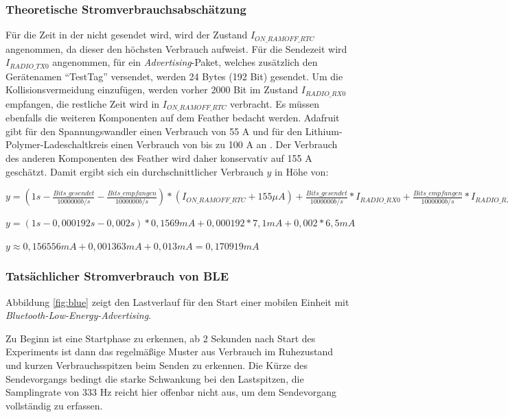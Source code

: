 \subsubsection{Theoretische Stromverbrauchsabschätzung}
Für die Zeit in der nicht gesendet wird, wird der Zustand $I_{ON\_RAMOFF\_RTC}$ angenommen, da dieser den höchsten Verbrauch aufweist.
Für die Sendezeit wird $I_{RADIO\_TX0}$ angenommen, für ein \emph{Advertising}-Paket, welches zusätzlich den Gerätenamen "`TestTag"' versendet, werden 24 Bytes (192 Bit) gesendet.
Um die Kollisionsvermeidung einzufügen, werden vorher 2000 Bit im Zustand $I_{RADIO\_RX0}$ empfangen, die restliche Zeit wird in $I_{ON\_RAMOFF\_RTC}$ verbracht.
Es müssen ebenfalls die weiteren Komponenten auf dem Feather bedacht werden.
Adafruit gibt für den Spannungswandler einen Verbrauch von 55 \textmu A und für den Lithium-Polymer-Ladeschaltkreis einen Verbrauch von bis zu 100 \textmu A an \cite{fried2016lora}.
Der Verbrauch des anderen Komponenten des Feather wird daher konservativ auf 155 \textmu A geschätzt.
Damit ergibt sich ein durchschnittlicher Verbrauch $y$ in Höhe von:

$y = (1s-\frac{Bits\_gesendet}{1000000 b/s} - \frac{Bits\_empfangen}{1000000 b/s}) * (I_{ON\_RAMOFF\_RTC} + 155 {\mu}A) + \frac{Bits\_gesendet}{1000000 b/s} * I_{RADIO\_RX0} + \frac{Bits\_empfangen}{1000000 b/s} * I_{RADIO\_RX0}$

$y = (1s - 0,000192s - 0,002s) * 0,1569mA + 0,000192 * 7,1mA + 0,002 * 6,5mA$

$y \approx 0,156556mA + 0,001363mA + 0,013mA = 0,170919mA$

\subsubsection{Tatsächlicher Stromverbrauch von BLE}
\label{ch:phase3:sec:powerble}
Abbildung \ref{fig:blue} zeigt den Lastverlauf für den Start einer mobilen Einheit mit \emph{Bluetooth-Low-Energy-Advertising}.

Zu Beginn ist eine Startphase zu erkennen, ab 2 Sekunden nach Start des Experiments ist dann das regelmäßige Muster aus Verbrauch im Ruhezustand und kurzen Verbrauchsspitzen beim Senden zu erkennen.
Die Kürze des Sendevorgangs bedingt die starke Schwankung bei den Lastspitzen, die Samplingrate von 333 Hz reicht hier offenbar nicht aus, um dem Sendevorgang vollständig zu erfassen.

